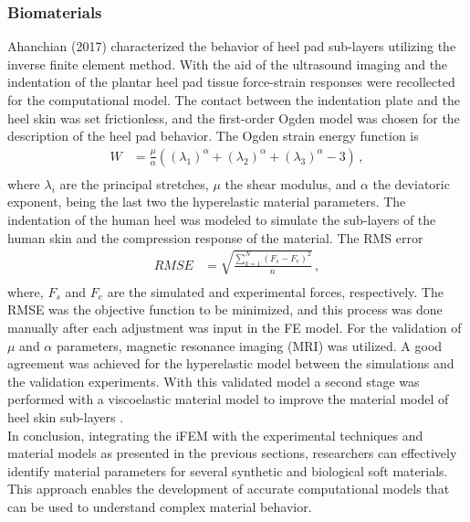 \subsubsection*{Biomaterials}

Ahanchian (2017) characterized the behavior of heel pad sub-layers utilizing the inverse finite element method.
With the aid of the ultrasound imaging and the indentation of the plantar heel pad tissue force-strain responses were recollected 
for the computational model. The contact between the indentation plate and the heel skin was set frictionless, and the first-order 
Ogden model was chosen for the description of the heel pad behavior. The Ogden strain energy function is
\begin{align}
        W &= \frac{\mu}{\alpha}((\lambda_1)^{\alpha} + (\lambda_2)^{\alpha} + (\lambda_3)^{\alpha} - 3) \,,\\
\end{align}
where $\lambda_i$ are the principal stretches, $\mu$ the shear modulus, and $\alpha$ the deviatoric exponent, being the last two
the hyperelastic material parameters. 
The indentation of the human heel was modeled to simulate the sub-layers of the human skin and the compression response of the material.
The RMS error 
\begin{align}
        RMSE &= \sqrt{\frac{\sum_{k=1}^N (F_s - F_e)^2}{n} }\,,\\
\end{align}
where, $F_s$ and $F_e$ are the simulated and experimental forces, respectively. The RMSE was the objective function to be minimized, 
and this process was done manually after each adjustment was input in the FE model. 
For the validation of  $\mu$ and $\alpha$ parameters, magnetic resonance imaging (MRI) was utilized.
A good agreement was achieved for the hyperelastic model between the simulations and the validation experiments. With this validated model 
a second stage was performed with a viscoelastic material model to improve the material model of heel skin sub-layers \cite{Ahanchian2017}.\\

In conclusion, integrating the iFEM with the experimental techniques and material models as presented in the previous sections, 
researchers can effectively identify material parameters for several synthetic and biological soft materials. 
This approach enables the development of accurate computational models that can be used to understand complex material behavior. 

